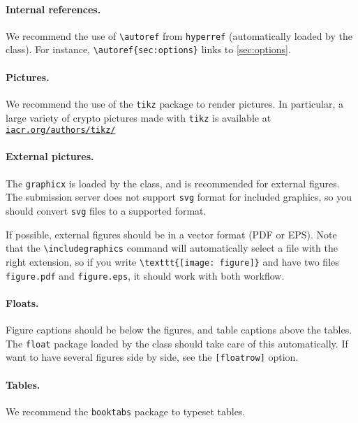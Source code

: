\documentclass{iacrcc}
\begin{document}
\paragraph{Internal references.}

We recommend the use of \verb+\autoref+ from \texttt{hyperref}
(automatically loaded by the class).  For instance,
\verb+\autoref{sec:options}+ links to \autoref{sec:options}.

\paragraph{Pictures.}

We recommend the use of the \texttt{tikz} package to render pictures.
In particular, a large variety of crypto pictures made with
\texttt{tikz} is available at \href{http://iacr.org/authors/tikz/}{\texttt{iacr.org/authors/tikz/}}

\paragraph{External pictures.}  The \texttt{graphicx} is loaded by the
class, and is recommended for external figures. The submission server
does not support \texttt{svg} format for included graphics, so
you should convert \texttt{svg} files to a supported format.

If possible, external figures should be in a vector format (PDF or
EPS).  Note that the \verb+\includegraphics+ command will
automatically select a file with the right extension, so if you write
\verb+\texttt{[image: figure]}+ and have two files \texttt{figure.pdf}
and \texttt{figure.eps}, it should work with both workflow.

\paragraph{Floats.}

Figure captions should be below the figures, and table captions above
the tables.  The \texttt{float} package loaded by the class should
take care of this automatically.  If want to have several figures side
by side, see the \texttt{[floatrow]} option.

\paragraph{Tables.}

We recommend the \texttt{booktabs} package to typeset tables.
\end{document}

